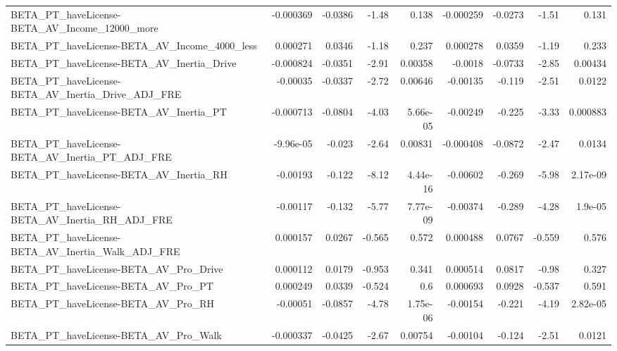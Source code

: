 \begin{tabular}{lrrrrrrrr}
BETA\_PT\_haveLicense-BETA\_AV\_Income\_12000\_more      &   -0.000369 &      -0.0386 &    -1.48 &    0.138 &  -0.000259 &     -0.0273 &        -1.51 &         0.131 \\
BETA\_PT\_haveLicense-BETA\_AV\_Income\_4000\_less       &    0.000271 &       0.0346 &    -1.18 &    0.237 &   0.000278 &      0.0359 &        -1.19 &         0.233 \\
BETA\_PT\_haveLicense-BETA\_AV\_Inertia\_Drive          &   -0.000824 &      -0.0351 &    -2.91 &  0.00358 &    -0.0018 &     -0.0733 &        -2.85 &       0.00434 \\
BETA\_PT\_haveLicense-BETA\_AV\_Inertia\_Drive\_ADJ\_FRE  &    -0.00035 &      -0.0337 &    -2.72 &  0.00646 &   -0.00135 &      -0.119 &        -2.51 &        0.0122 \\
BETA\_PT\_haveLicense-BETA\_AV\_Inertia\_PT             &   -0.000713 &      -0.0804 &    -4.03 & 5.66e-05 &   -0.00249 &      -0.225 &        -3.33 &      0.000883 \\
BETA\_PT\_haveLicense-BETA\_AV\_Inertia\_PT\_ADJ\_FRE     &   -9.96e-05 &       -0.023 &    -2.64 &  0.00831 &  -0.000408 &     -0.0872 &        -2.47 &        0.0134 \\
BETA\_PT\_haveLicense-BETA\_AV\_Inertia\_RH             &    -0.00193 &       -0.122 &    -8.12 & 4.44e-16 &   -0.00602 &      -0.269 &        -5.98 &      2.17e-09 \\
BETA\_PT\_haveLicense-BETA\_AV\_Inertia\_RH\_ADJ\_FRE     &    -0.00117 &       -0.132 &    -5.77 & 7.77e-09 &   -0.00374 &      -0.289 &        -4.28 &       1.9e-05 \\
BETA\_PT\_haveLicense-BETA\_AV\_Inertia\_Walk\_ADJ\_FRE   &    0.000157 &       0.0267 &   -0.565 &    0.572 &   0.000488 &      0.0767 &       -0.559 &         0.576 \\
BETA\_PT\_haveLicense-BETA\_AV\_Pro\_Drive              &    0.000112 &       0.0179 &   -0.953 &    0.341 &   0.000514 &      0.0817 &        -0.98 &         0.327 \\
BETA\_PT\_haveLicense-BETA\_AV\_Pro\_PT                 &    0.000249 &       0.0339 &   -0.524 &      0.6 &   0.000693 &      0.0928 &       -0.537 &         0.591 \\
BETA\_PT\_haveLicense-BETA\_AV\_Pro\_RH                 &    -0.00051 &      -0.0857 &    -4.78 & 1.75e-06 &   -0.00154 &      -0.221 &        -4.19 &      2.82e-05 \\
BETA\_PT\_haveLicense-BETA\_AV\_Pro\_Walk               &   -0.000337 &      -0.0425 &    -2.67 &  0.00754 &   -0.00104 &      -0.124 &        -2.51 &        0.0121 \\

\end{tabular}
